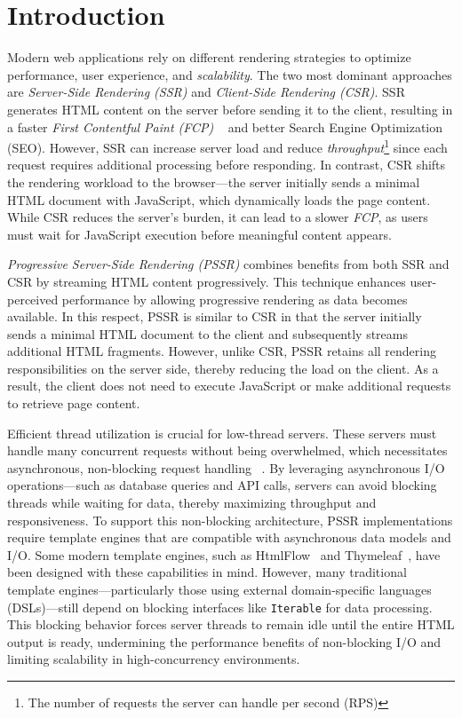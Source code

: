 \section{Introduction}


Modern web applications rely on different rendering strategies to optimize
performance, user experience, and \textit{scalability}. The two most dominant
approaches are \textit{Server-Side Rendering (SSR)} and \textit{Client-Side
    Rendering (CSR)}. SSR generates HTML content on the server before sending it to
the client, resulting in a faster \textit{First Contentful Paint (FCP)}
~\cite{Edgar2024-FCP} and better Search Engine Optimization (SEO). However, SSR
can increase server load and reduce \textit{throughput}\footnote{The number of
    requests the server can handle per second (RPS)} since each request requires
additional processing before responding. In contrast, CSR shifts the rendering
workload to the browser—the server initially sends a minimal HTML document with
JavaScript, which dynamically loads the page content. While CSR reduces the
server’s burden, it can lead to a slower \textit{FCP}, as users must wait for
JavaScript execution before meaningful content appears.

\textit{Progressive Server-Side Rendering (PSSR)} combines benefits from both SSR and CSR
by streaming HTML content progressively. This technique enhances user-perceived performance by
allowing progressive rendering as data becomes available. In this respect,
PSSR is similar to CSR in that the server initially sends a minimal HTML
document to the client and subsequently streams additional HTML fragments.
However, unlike CSR, PSSR retains all rendering responsibilities on the server side,
thereby reducing the load on the client. As a result, the client does
not need to execute JavaScript or make additional requests to retrieve page content.

Efficient thread utilization is crucial for low-thread servers. These servers
must handle many concurrent requests without being overwhelmed, which
necessitates asynchronous, non-blocking request handling
~\cite{carvalho2023async}. By leveraging asynchronous I/O operations—such as
database queries and API calls, servers can avoid blocking threads while
waiting for data, thereby maximizing throughput and responsiveness. To support
this non-blocking architecture, PSSR implementations require template engines
that are compatible with asynchronous data models and I/O. Some modern template
engines, such as HtmlFlow~\cite{htmlflow} and Thymeleaf~\cite{thymeleaf}, have
been designed with these capabilities in mind. However, many traditional
template engines—particularly those using external domain-specific languages
~\cite{Fowler03} (DSLs)—still depend on blocking interfaces like
\texttt{Iterable} for data processing. This blocking behavior forces server
threads to remain idle until the entire HTML output is ready, undermining the
performance benefits of non-blocking I/O and limiting scalability in
high-concurrency environments. 

